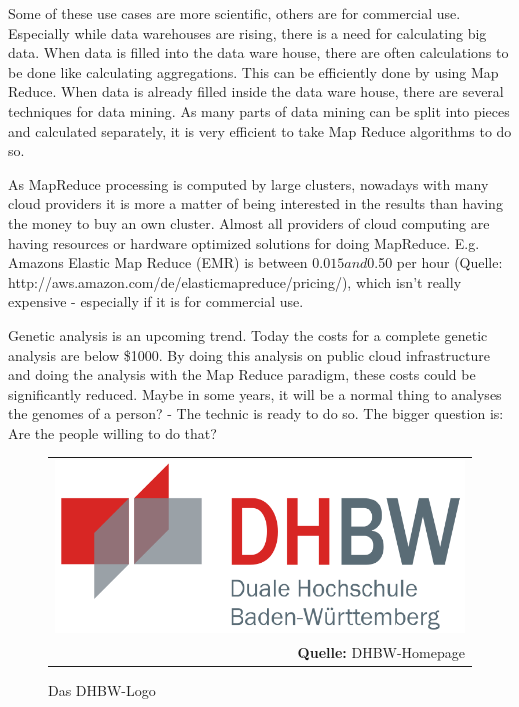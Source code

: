Some of these use cases are more scientific, others are for commercial use. Especially while data
warehouses are rising, there is a need for calculating big data. When data is filled into the data
ware house, there are often calculations to be done like calculating aggregations. This can be
efficiently done by using Map Reduce. When data is already filled inside the data ware house, there
are several techniques for data mining. As many parts of data mining can be split into pieces and
calculated separately, it is very efficient to take Map Reduce algorithms to do so.

As MapReduce processing is computed by large clusters, nowadays with many cloud providers it is more
a matter of being interested in the results than having the money to buy an own cluster. Almost all
providers of cloud computing are having resources or hardware optimized solutions for doing
MapReduce. E.g. Amazons Elastic Map Reduce (EMR) is between $0.015 and $0.50 per hour (Quelle:
http://aws.amazon.com/de/elasticmapreduce/pricing/), which isn’t really expensive - especially if it
is for commercial use.

Genetic analysis is an upcoming trend. Today the costs for a complete genetic analysis are below
\$1000. By doing this analysis on public cloud infrastructure and doing the analysis with the Map
Reduce paradigm, these costs could be significantly reduced. Maybe in some years, it will be a
normal thing to analyses the genomes of a person? - The technic is ready to do so. The bigger
question is: Are the people willing to do that?


\begin{figure} [!htb]
	\begin{center}
		  \begin{tabular}{@{}r@{}}
		{\includegraphics[width=14cm]{images/dhbw-Logo.png}}\\
		\footnotesize\sffamily\textbf{Quelle:} DHBW-Homepage
	  		   \cite{LiteraturEintrag1}
 	 	 \end{tabular}
		\caption{Das DHBW-Logo}
		\label{fig:DHBWLogo}
	\end{center}
\end{figure}
